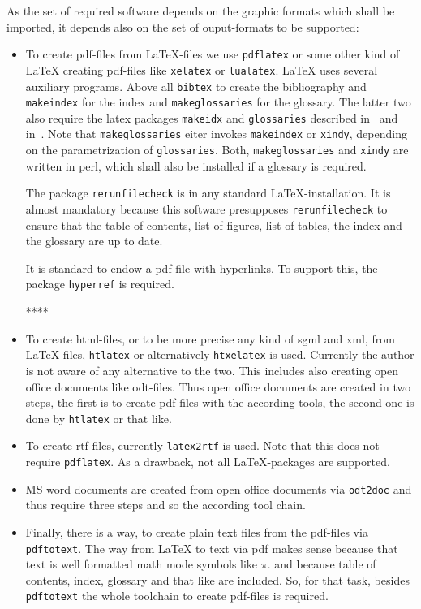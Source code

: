 \documentclass[12pt]{book}
\begin{document}
As the set of required software depends on the graphic formats 
which shall be imported, 
it depends also on the set of ouput-formats 
to be supported: 
%
\begin{itemize}
\item
To create pdf-files from \LaTeX-files we use {\tt pdflatex} 
or some other kind of \LaTeX{} creating pdf-files 
like {\tt xelatex} or {\tt lualatex}. 
\LaTeX{} uses several auxiliary programs. 
Above all {\tt bibtex} to create the bibliography 
and {\tt makeindex} for the index and {\tt makeglossaries} for the glossary. 
The latter two 
also require the latex packages {\tt makeidx} and {\tt glossaries} 
described in~\cite{MkidxShIdxP} and in~\cite{GloP}. 
Note that {\tt makeglossaries} eiter invokes {\tt makeindex} 
or {\tt xindy}, depending on the parametrization of {\tt glossaries}. 
Both, {\tt makeglossaries} and {\tt xindy} are written in perl, 
which shall also be installed if a glossary is required. 

The package {\tt rerunfilecheck} is in any standard \LaTeX-installation. 
It is almost mandatory 
because this software presupposes {\tt rerunfilecheck} 
to ensure that the table of contents, list of figures, list of tables, 
the index and the glossary are up to date. 

It is standard to endow a pdf-file with hyperlinks. 
To support this, the package {\tt hyperref} is required. 

****
\item
To create \gls{html}-files, 
or to be more precise any kind of \gls{sgml} and \gls{xml}, 
from \LaTeX-files, {\tt htlatex} or alternatively {\tt htxelatex} is used. 
Currently the author is not aware of any alternative to the two. 
This includes also creating open office documents like odt-files. 
Thus open office documents are created in two steps, 
the first is to create pdf-files with the according tools, 
the second one is done by {\tt htlatex} or that like. 
\item
To create rtf-files, currently {\tt latex2rtf} is used. 
Note that this does not require {\tt pdflatex}. 
As a drawback, not all \LaTeX-packages are supported. 
\item
MS word documents are created from open office documents via {\tt odt2doc} 
and thus require three steps 
and so the according tool chain. 
\item
Finally, there is a way, to create plain text files from the pdf-files 
via {\tt pdftotext}. 
The way from \LaTeX{} to text via pdf makes sense 
because that text is well formatted math mode symbols like $\pi$. 
and because table of contents, index, glossary and that like are included. 
So, for that task, besides {\tt pdftotext} the whole toolchain to create
pdf-files is required. 
\end{itemize}
\end{document}
